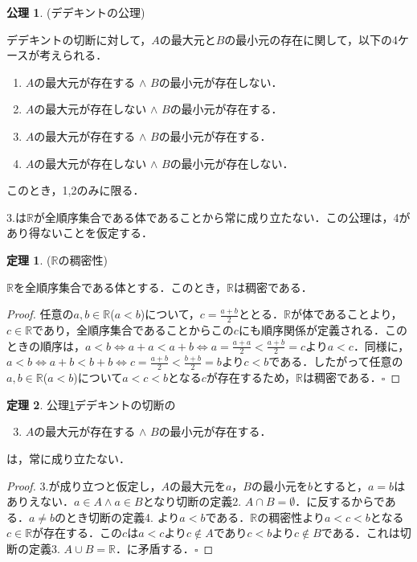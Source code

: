 \documentclass[oneside,openany]{jbook}
\theoremstyle{definition}
\newtheorem{axiom}{公理}
\newtheorem{theorem}{定理}
\begin{document}
\begin{axiom}{(デデキントの公理)}\label{axiom:d_axiom}

デデキントの切断に対して，$A$の最大元と$B$の最小元の存在に関して，以下の4ケースが考えられる．

\begin{enumerate}
\item $A$の最大元が存在する $\land$ $B$の最小元が存在しない．
\item $A$の最大元が存在しない $\land$ $B$の最小元が存在する．
\item $A$の最大元が存在する $\land$ $B$の最小元が存在する．
\item $A$の最大元が存在しない $\land$ $B$の最小元が存在しない．
\end{enumerate}

このとき，1,2のみに限る．
\end{axiom}

3.は$\mathbb{R}$が全順序集合である体であることから常に成り立たない．この公理は，4があり得ないことを仮定する．

\begin{theorem}{($\mathbb{R}$の稠密性)}

$\mathbb{R}$を全順序集合である体とする．このとき，$\mathbb{R}$は稠密である．
\end{theorem}

\begin{proof}
任意の$a,b \in \mathbb{R}$($a < b$)について，$c=\frac{a+b}{2}$ととる．$\mathbb{R}$が体であることより，$c \in \mathbb{R}$であり，全順序集合であることからこの$c$にも順序関係が定義される．このときの順序は，$a < b \iff a + a < a + b \iff a = \frac{a + a}{2} < \frac{a + b}{2} = c$より$a < c$．同様に，$a < b \iff a + b < b + b \iff c = \frac{a + b}{2} < \frac{b + b}{2} = b$より$c < b$である．したがって任意の$a,b \in \mathbb{R}$($a < b$)について$a < c < b$となる$c$が存在するため，$\mathbb{R}$は稠密である．$\square$
\end{proof}

\begin{theorem}

公理\ref{axiom:d_axiom}デデキントの切断の

\begin{enumerate}
\setcounter{enumi}{2}
\item $A$の最大元が存在する $\land$ $B$の最小元が存在する．
\end{enumerate}
は，常に成り立たない．
\end{theorem}

\begin{proof}
3.が成り立つと仮定し，$A$の最大元を$a$，$B$の最小元を$b$とすると，$a=b$はありえない．$a \in A \land a \in B$となり切断の定義2. $A \cap B = \emptyset$．に反するからである．$a \neq b$のとき切断の定義4. より$a < b$である．$\mathbb{R}$の稠密性より$a < c < b$となる$c \in \mathbb{R}$が存在する．この$c$は$a < c$より$c \notin A$であり$c < b$より$c \notin B$である．これは切断の定義3. $A \cup B = \mathbb{R}$．に矛盾する．$\square$
\end{proof}
\end{document}
